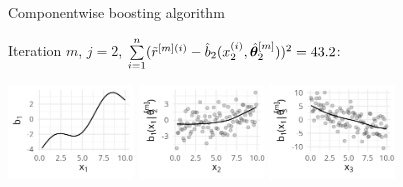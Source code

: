\documentclass[11pt,compress,t,notes=noshow, xcolor=table]{beamer}
\begin{document}
\begin{vbframe}{Componentwise boosting algorithm}



{\footnotesize Iteration $m$, $j = 2$, $\sum  \limits_{i=1}^n (\tilde{r}^{[m](i)} - \hat{b}_2(x^{(i)}_2, \hat{\bm{\theta}}^{[m]}_2))^2 = 43.2$: }
\begin{center}
{\includegraphics[width=0.25\textwidth]{figure/boosting-cwb-bl1.png}}
\hspace*{0.5cm}
\includegraphics[width=0.25\textwidth]{figure/boosting-cwb-bl2-points.png}
\hspace*{0.5cm}
{\includegraphics[width=0.25\textwidth]{figure/boosting-cwb-bl3-points.png}}
\end{center}
\addtocounter{framenumber}{-1}
\end{vbframe}

\end{document}
